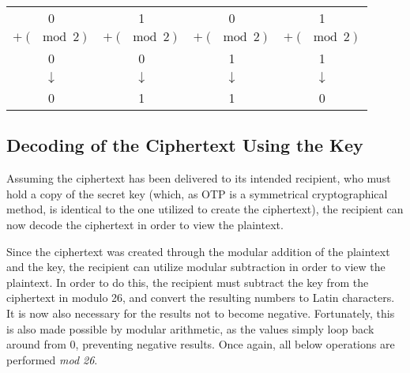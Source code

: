 \documentclass[12pt, a4paper]{report}
\theoremstyle{definition}
\theoremstyle{remark}
\begin{document}
\begin{center}
\begin{tabular}{cccc}
0 & 1 & 0 & 1 \\
$+(\mod 2)$ & $+(\mod 2)$ & $+(\mod 2)$ & $+(\mod 2)$ \\
0 & 0 & 1 & 1 \\
$\downarrow$ & $\downarrow$ & $\downarrow$ & $\downarrow$ \\
0 & 1 & 1 & 0
\end{tabular}
\end{center}

\hfill
\subsection{Decoding of the Ciphertext Using the Key}
Assuming the ciphertext has been delivered to its intended recipient, who must hold a copy of the secret key (which, as OTP is a symmetrical cryptographical method, is identical to the one utilized to create the ciphertext), the recipient can now decode the ciphertext in order to view the plaintext.

Since the ciphertext was created through the modular addition of the plaintext and the key, the recipient can utilize modular subtraction in order to view the plaintext. In order to do this, the recipient must subtract the key from the ciphertext in modulo 26, and convert the resulting numbers to Latin characters. It is now also necessary for the results not to become negative. Fortunately, this is also made possible by modular arithmetic, as the values simply loop back around from 0, preventing negative results. Once again, all below operations are performed \textit{mod 26}.

\begin{center}
\end{center}
\end{document}

